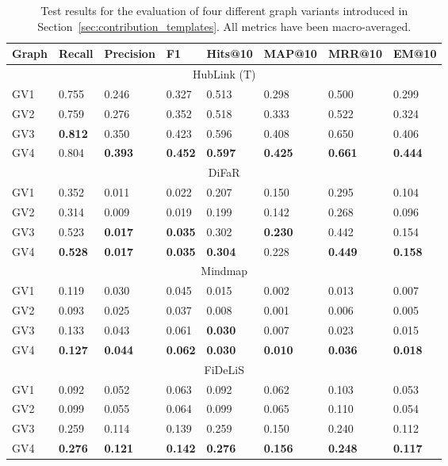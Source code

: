 \begin{table}[t]
\centering
\begin{tabular}{@{}llllllll@{}}
\toprule
Graph & Recall & Precision & F1 & Hits@10 & MAP@10 & MRR@10 & EM@10 \\
\midrule
\multicolumn{8}{c}{HubLink (T)} \\
\midrule
GV1 & 0.755 & 0.246 & 0.327 & 0.513 & 0.298 & 0.500 & 0.299 \\
GV2 & 0.759 & 0.276 & 0.352 & 0.518 & 0.333 & 0.522 & 0.324 \\
GV3 & \textbf{0.812} & 0.350 & 0.423 & 0.596 & 0.408 & 0.650 & 0.406 \\
GV4 & 0.804 & \textbf{0.393} & \textbf{0.452} & \textbf{0.597} & \textbf{0.425} & \textbf{0.661} & \textbf{0.444} \\
\midrule
\multicolumn{8}{c}{DiFaR} \\
\midrule
GV1 & 0.352 & 0.011 & 0.022 & 0.207 & 0.150 & 0.295 & 0.104 \\
GV2 & 0.314 & 0.009 & 0.019 & 0.199 & 0.142 & 0.268 & 0.096 \\
GV3 & 0.523 & \textbf{0.017} & \textbf{0.035} & 0.302 & \textbf{0.230} & 0.442 & 0.154 \\
GV4 & \textbf{0.528} & \textbf{0.017} & \textbf{0.035} & \textbf{0.304} & 0.228 & \textbf{0.449} & \textbf{0.158} \\
\midrule
\multicolumn{8}{c}{Mindmap} \\
\midrule
GV1 & 0.119 & 0.030 & 0.045 & 0.015 & 0.002 & 0.013 & 0.007 \\
GV2 & 0.093 & 0.025 & 0.037 & 0.008 & 0.001 & 0.006 & 0.005 \\
GV3 & 0.133 & 0.043 & 0.061 & \textbf{0.030} & 0.007 & 0.023 & 0.015 \\
GV4 & \textbf{0.127} & \textbf{0.044} & \textbf{0.062} & \textbf{0.030} & \textbf{0.010} & \textbf{0.036} & \textbf{0.018} \\
\midrule
\multicolumn{8}{c}{FiDeLiS} \\
\midrule
GV1 & 0.092 & 0.052 & 0.063 & 0.092 & 0.062 & 0.103 & 0.053 \\
GV2 & 0.099 & 0.055 & 0.064 & 0.099 & 0.065 & 0.110 & 0.054 \\
GV3 & 0.259 & 0.114 & 0.139 & 0.259 & 0.150 & 0.240 & 0.112 \\
GV4 & \textbf{0.276} & \textbf{0.121} & \textbf{0.142} & \textbf{0.276} & \textbf{0.156} & \textbf{0.248} & \textbf{0.117} \\
\bottomrule 
\end{tabular}%
\caption[Results on Retrieval Performance on Different Graph Variants]{Test results for the evaluation of four different graph variants introduced in Section~\ref{sec:contribution_templates}. All metrics have been macro-averaged.}
\label{tab:q5:different_graph_variants}
\end{table}

